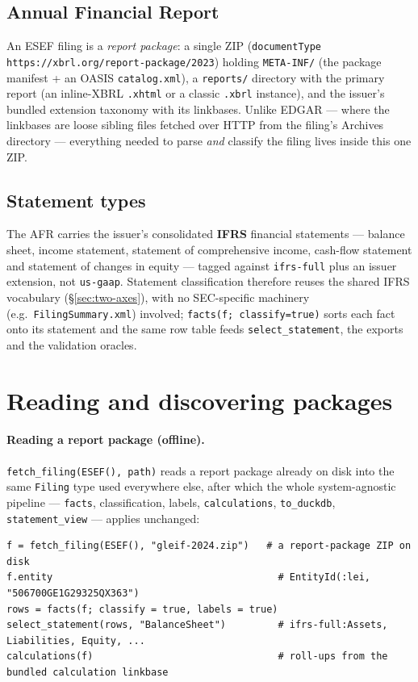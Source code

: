\documentclass[11pt,a4paper]{report}
\begin{document}
\subsection{Annual Financial Report}
An ESEF filing is a \emph{report package}: a single ZIP (\texttt{documentType
https://xbrl.org/report-package/2023}) holding \texttt{META-INF/} (the package manifest + an OASIS
\texttt{catalog.xml}), a \texttt{reports/} directory with the primary report (an inline-XBRL \texttt{.xhtml}
or a classic \texttt{.xbrl} instance), and the issuer's bundled extension taxonomy with its linkbases.
Unlike EDGAR --- where the linkbases are loose sibling files fetched over HTTP from the filing's Archives
directory --- everything needed to parse \emph{and} classify the filing lives inside this one ZIP.

\subsection{Statement types}
The AFR carries the issuer's consolidated \textbf{IFRS} financial statements --- balance sheet, income
statement, statement of comprehensive income, cash-flow statement and statement of changes in equity ---
tagged against \texttt{ifrs-full} plus an issuer extension, not \texttt{us-gaap}. Statement classification
therefore reuses the shared IFRS vocabulary (\S\ref{sec:two-axes}), with no SEC-specific machinery (e.g.\
\texttt{FilingSummary.xml}) involved; \texttt{facts(f; classify=true)} sorts each fact onto its statement
and the same row table feeds \texttt{select\_statement}, the exports and the validation oracles.

\section{Reading and discovering packages}

\paragraph{Reading a report package (offline).} \texttt{fetch\_filing(ESEF(), path)} reads a report
package already on disk into the same \texttt{Filing} type used everywhere else, after which the whole
system-agnostic pipeline --- \texttt{facts}, classification, labels, \texttt{calculations},
\texttt{to\_duckdb}, \texttt{statement\_view} --- applies unchanged:

\begin{lstlisting}
f = fetch_filing(ESEF(), "gleif-2024.zip")   # a report-package ZIP on disk
f.entity                                       # EntityId(:lei, "506700GE1G29325QX363")
rows = facts(f; classify = true, labels = true)
select_statement(rows, "BalanceSheet")         # ifrs-full:Assets, Liabilities, Equity, ...
calculations(f)                                # roll-ups from the bundled calculation linkbase
\end{lstlisting}
\end{document}
